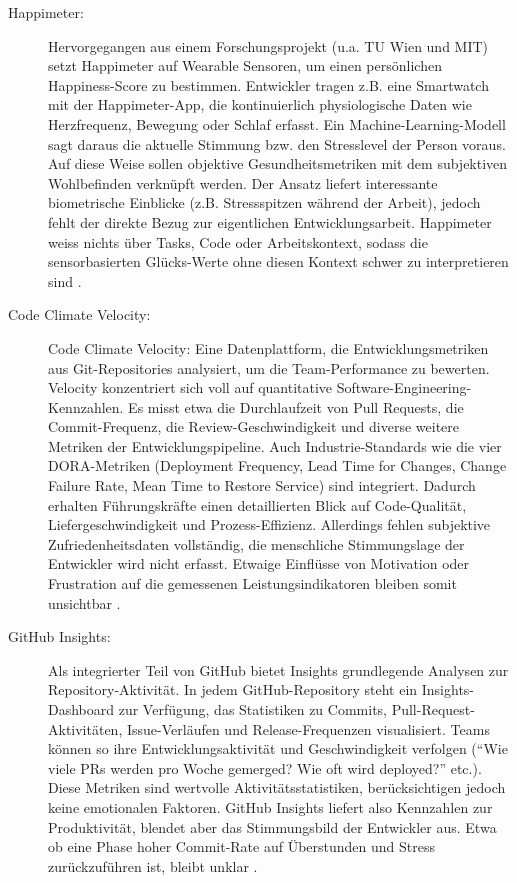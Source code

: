 \documentclass[12pt,a4paper]{report}
\begin{document}
\begin{description}
  \item[Happimeter:] Hervorgegangen aus einem Forschungsprojekt (u.a. TU Wien und MIT) setzt Happimeter auf Wearable Sensoren, um
    einen persönlichen Happiness-Score zu bestimmen. Entwickler tragen z.B. eine Smartwatch mit der Happimeter-App, die
    kontinuierlich physiologische Daten wie Herzfrequenz, Bewegung oder Schlaf erfasst. Ein Machine-Learning-Modell sagt daraus
    die aktuelle Stimmung bzw. den Stresslevel der Person voraus. Auf diese Weise sollen objektive Gesundheitsmetriken mit dem
    subjektiven Wohlbefinden verknüpft werden. Der Ansatz liefert interessante biometrische Einblicke (z.B. Stressspitzen während
    der Arbeit), jedoch fehlt der direkte Bezug zur eigentlichen Entwicklungsarbeit. Happimeter weiss nichts über Tasks, Code oder
    Arbeitskontext, sodass die sensorbasierten Glücks-Werte ohne diesen Kontext schwer zu interpretieren sind
    \cite{budner_making_2017}.

  \item[Code Climate Velocity:] Code Climate Velocity: Eine Datenplattform, die Entwicklungsmetriken aus Git-Repositories analysiert,
    um die Team-Performance zu bewerten. Velocity konzentriert sich voll auf quantitative Software-Engineering-Kennzahlen. Es misst
    etwa die Durchlaufzeit von Pull Requests, die Commit-Frequenz, die Review-Geschwindigkeit und diverse weitere Metriken der
    Entwicklungspipeline. Auch Industrie-Standards wie die vier DORA-Metriken (Deployment Frequency, Lead Time for Changes, Change
    Failure Rate, Mean Time to Restore Service) sind integriert. Dadurch erhalten Führungskräfte einen detaillierten Blick auf
    Code-Qualität, Liefergeschwindigkeit und Prozess-Effizienz. Allerdings fehlen subjektive Zufriedenheitsdaten vollständig, die
    menschliche Stimmungslage der Entwickler wird nicht erfasst. Etwaige Einflüsse von Motivation oder Frustration auf die
    gemessenen Leistungsindikatoren bleiben somit unsichtbar \cite{infoworld_codeclimate_2023}.

  \item[GitHub Insights:] Als integrierter Teil von GitHub bietet Insights grundlegende Analysen zur Repository-Aktivität. In jedem
    GitHub-Repository steht ein Insights-Dashboard zur Verfügung, das Statistiken zu Commits, Pull-Request-Aktivitäten,
    Issue-Verläufen und Release-Frequenzen visualisiert. Teams können so ihre Entwicklungsaktivität und Geschwindigkeit verfolgen
    (“Wie viele PRs werden pro Woche gemerged? Wie oft wird deployed?” etc.). Diese Metriken sind wertvolle Aktivitätsstatistiken,
    berücksichtigen jedoch keine emotionalen Faktoren. GitHub Insights liefert also Kennzahlen zur Produktivität, blendet aber das
    Stimmungsbild der Entwickler aus. Etwa ob eine Phase hoher Commit-Rate auf Überstunden und Stress zurückzuführen ist, bleibt
    unklar \cite{axify_git_2025}.


\end{description}
\end{document}
